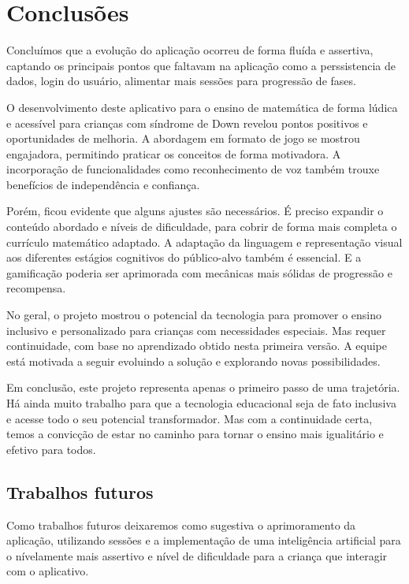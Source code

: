 \chapter{Conclusões}\label{chp:conc}

Concluímos que a evolução do aplicação ocorreu de forma fluída e assertiva, captando os principais pontos que faltavam na aplicação como a perssistencia de dados, login do usuário, alimentar mais sessões para progressão de fases. 

O desenvolvimento deste aplicativo para o ensino de matemática de forma lúdica e acessível para crianças com síndrome de Down revelou pontos positivos e oportunidades de melhoria. A abordagem em formato de jogo se mostrou engajadora, permitindo praticar os conceitos de forma motivadora. A incorporação de funcionalidades como reconhecimento de voz também trouxe benefícios de independência e confiança.

Porém, ficou evidente que alguns ajustes são necessários. É preciso expandir o conteúdo abordado e níveis de dificuldade, para cobrir de forma mais completa o currículo matemático adaptado. A adaptação da linguagem e representação visual aos diferentes estágios cognitivos do público-alvo também é essencial. E a gamificação poderia ser aprimorada com mecânicas mais sólidas de progressão e recompensa.

No geral, o projeto mostrou o potencial da tecnologia para promover o ensino inclusivo e personalizado para crianças com necessidades especiais. Mas requer continuidade, com base no aprendizado obtido nesta primeira versão. A equipe está motivada a seguir evoluindo a solução e explorando novas possibilidades.


Em conclusão, este projeto representa apenas o primeiro passo de uma trajetória. Há ainda muito trabalho para que a tecnologia educacional seja de fato inclusiva e acesse todo o seu potencial transformador. Mas com a continuidade certa, temos a convicção de estar no caminho para tornar o ensino mais igualitário e efetivo para todos.



\section{Trabalhos futuros}

Como trabalhos futuros deixaremos como sugestiva o aprimoramento da aplicação, utilizando sessões e a implementação de uma inteligência artificial para o nívelamente mais assertivo e nível de dificuldade para a criança que interagir com o aplicativo. 



